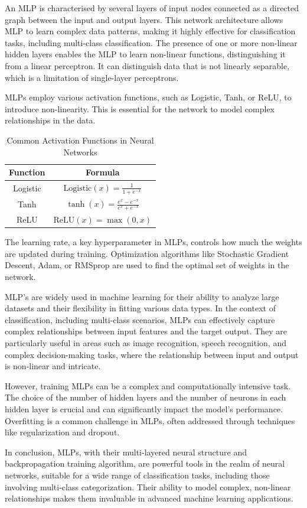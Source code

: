An MLP is characterised by several layers of input nodes connected as a directed graph between the input and output layers. This network architecture allows MLP to learn complex data patterns, making it highly effective for classification tasks, including multi-class classification. The presence of one or more non-linear hidden layers enables the MLP to learn non-linear functions, distinguishing it from a linear perceptron. It can distinguish data that is not linearly separable, which is a limitation of single-layer perceptrons.

MLPs employ various activation functions, such as Logistic, Tanh, or ReLU, to introduce non-linearity. This is essential for the network to model complex relationships in the data.

\begin{table}[h]
    \centering
    \begin{tabular}{|c|c|}
    \hline
    \textbf{Function} & \textbf{Formula} \\ \hline
    Logistic          & $\text{Logistic}(x) = \frac{1}{1 + e^{-x}}$ \\  \hline
       Tanh              & $\tanh(x) = \frac{e^{x} - e^{-x}}{e^{x} + e^{-x}}$ \\ \hline
    ReLU              & $\text{ReLU}(x) = \max(0, x)$ \\ \hline
    
    \end{tabular}
    \caption{Common Activation Functions in Neural Networks}
    \label{tab:activation_functions}
    \end{table}
    

The learning rate, a key hyperparameter in MLPs, controls how much the weights are updated during training. Optimization algorithms like Stochastic Gradient Descent, Adam, or RMSprop are used to find the optimal set of weights in the network.

MLP’s are widely used in machine learning for their ability to analyze large datasets and their flexibility in fitting various data types. In the context of classification, including multi-class scenarios, MLPs can effectively capture complex relationships between input features and the target output. They are particularly useful in areas such as image recognition, speech recognition, and complex decision-making tasks, where the relationship between input and output is non-linear and intricate.

However, training MLPs can be a complex and computationally intensive task. The choice of the number of hidden layers and the number of neurons in each hidden layer is crucial and can significantly impact the model’s performance. Overfitting is a common challenge in MLPs, often addressed through techniques like regularization and dropout.

In conclusion, MLPs, with their multi-layered neural structure and backpropagation training algorithm, are powerful tools in the realm of neural networks, suitable for a wide range of classification tasks, including those involving multi-class categorization. Their ability to model complex, non-linear relationships makes them invaluable in advanced machine learning applications.

